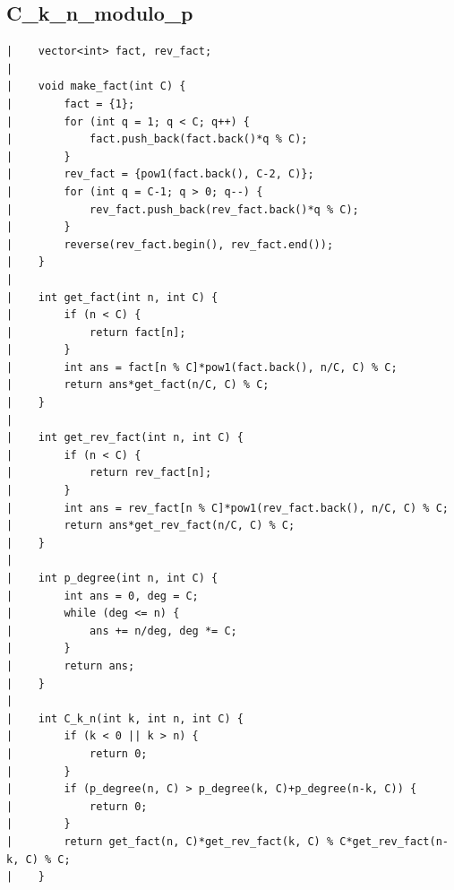 \documentclass[a4paper, 10pt]{article}
\begin{document}
\begin{center}
\section*{C\_k\_n\_modulo\_p}
\begin{verbatim}
|    vector<int> fact, rev_fact;
|    
|    void make_fact(int C) {
|        fact = {1};
|        for (int q = 1; q < C; q++) {
|            fact.push_back(fact.back()*q % C);
|        }
|        rev_fact = {pow1(fact.back(), C-2, C)};
|        for (int q = C-1; q > 0; q--) {
|            rev_fact.push_back(rev_fact.back()*q % C);
|        }
|        reverse(rev_fact.begin(), rev_fact.end());
|    }
|    
|    int get_fact(int n, int C) {
|        if (n < C) {
|            return fact[n];
|        }
|        int ans = fact[n % C]*pow1(fact.back(), n/C, C) % C;
|        return ans*get_fact(n/C, C) % C;
|    }
|    
|    int get_rev_fact(int n, int C) {
|        if (n < C) {
|            return rev_fact[n];
|        }
|        int ans = rev_fact[n % C]*pow1(rev_fact.back(), n/C, C) % C;
|        return ans*get_rev_fact(n/C, C) % C;
|    }
|    
|    int p_degree(int n, int C) {
|        int ans = 0, deg = C;
|        while (deg <= n) {
|            ans += n/deg, deg *= C;
|        }
|        return ans;
|    }
|    
|    int C_k_n(int k, int n, int C) {
|        if (k < 0 || k > n) {
|            return 0;
|        }
|        if (p_degree(n, C) > p_degree(k, C)+p_degree(n-k, C)) {
|            return 0;
|        }
|        return get_fact(n, C)*get_rev_fact(k, C) % C*get_rev_fact(n-k, C) % C;
|    }
\end{verbatim}


\end{center}
\end{document}
